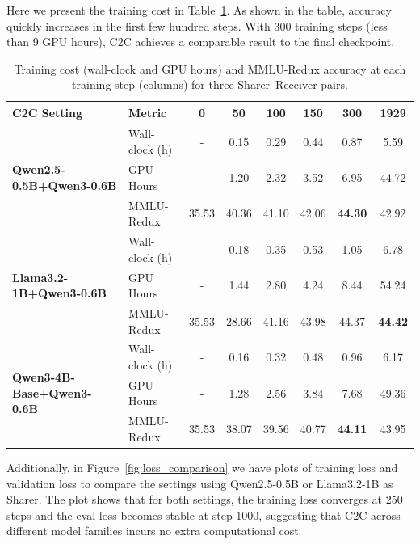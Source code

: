 Here we present the training cost in Table~\ref{tab:training_cost}. As shown in the table, accuracy quickly increases in the first few hundred steps. With 300 training steps (less than 9 GPU hours), C2C achieves a comparable result to the final checkpoint.

\begin{table}[b]
\centering
\small
\caption{Training cost (wall-clock and GPU hours) and MMLU-Redux accuracy at each training step (columns) for three Sharer–Receiver pairs.}
\label{tab:training_cost}
\begin{tabular}{l l | c c c c c c}
\toprule
\textbf{C2C Setting} & \textbf{Metric} & \textbf{0} & \textbf{50} & \textbf{100} & \textbf{150} & \textbf{300} & \textbf{1929} \\
\midrule
\multirow{3}{*}{\textbf{Qwen2.5-0.5B+Qwen3-0.6B}}
 & Wall-clock (h) & - & 0.15 & 0.29 & 0.44 & 0.87 & 5.59 \\
 & GPU Hours      & - & 1.20 & 2.32 & 3.52 & 6.95 & 44.72 \\
 & MMLU-Redux & 35.53 & 40.36 & 41.10 & 42.06 & \textbf{44.30} & 42.92 \\
\midrule
\multirow{3}{*}{\textbf{Llama3.2-1B+Qwen3-0.6B}}
 & Wall-clock (h) & - & 0.18 & 0.35 & 0.53 & 1.05 & 6.78 \\
 & GPU Hours      & - & 1.44 & 2.80 & 4.24 & 8.44 & 54.24 \\
 & MMLU-Redux & 35.53 & 28.66 & 41.16 & 43.98 & 44.37 & \textbf{44.42} \\
\midrule
\multirow{3}{*}{\textbf{Qwen3-4B-Base+Qwen3-0.6B}}
 & Wall-clock (h) & - & 0.16 & 0.32 & 0.48 & 0.96 & 6.17 \\
 & GPU Hours      & - & 1.28 & 2.56 & 3.84 & 7.68 & 49.36 \\
 & MMLU-Redux & 35.53 & 38.07 & 39.56 & 40.77 & \textbf{44.11} & 43.95 \\
\bottomrule
\end{tabular}
\end{table}


Additionally, in Figure~\ref{fig:loss_comparison} we have plots of training loss and validation loss to compare the settings using Qwen2.5-0.5B or Llama3.2-1B as Sharer. The plot shows that for both settings, the training loss converges at 250 steps and the eval loss becomes stable at step 1000, suggesting that C2C across different model families incurs no extra computational cost.



